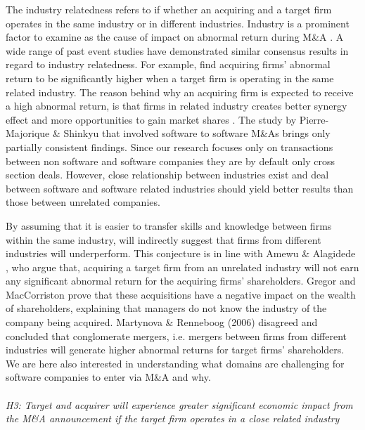 The industry relatedness refers to if whether an acquiring and a target firm operates in the same industry or in different industries. Industry is a prominent factor to examine as the cause of impact on abnormal return during M\&A \cite{ellwanger2015}. A wide range of past event studies have demonstrated similar consensus results in regard to industry relatedness. For example, \cite{scanlon1989,Bley2003,lim2016} find acquiring firms' abnormal return to be significantly higher when a target firm is operating in the same related industry. The reason behind why an acquiring firm is expected to receive a high abnormal return, is that firms in related industry creates better synergy effect and more opportunities to gain market shares \cite{scanlon1989impacts}. The study by  Pierre-Majorique \& Shinkyu \cite{Lger2005NetworkEA} that involved software to software M\&As brings only partially consistent findings. Since our research focuses only on transactions between non software and software companies they are by default only cross section deals. However, close relationship between industries exist and deal between software and software related industries should yield better results than those between unrelated companies.

By assuming that it is easier to transfer skills and knowledge between firms within the same industry, will indirectly suggest that firms from different industries will underperform. This conjecture is in line with Amewu \& Alagidede \cite{amewu}, who argue that, acquiring a target firm from an unrelated industry will not earn any significant abnormal return for the acquiring firms' shareholders. Gregor and MacCorriston \cite{Gregory} prove that these acquisitions have a negative impact on the wealth of shareholders, explaining  that managers do not know the industry of the company being acquired. Martynova \& Renneboog (2006) \cite{martynova2006mergers} disagreed and concluded that conglomerate mergers, i.e. mergers between firms from different industries will generate higher abnormal returns for target firms' shareholders. We are here also interested in understanding what domains are challenging for software companies to enter via M\&A and why. 
\\
\\
\textit{H3: Target and acquirer will experience greater significant economic impact from the M\&A announcement if the target firm operates in a close related industry}\\